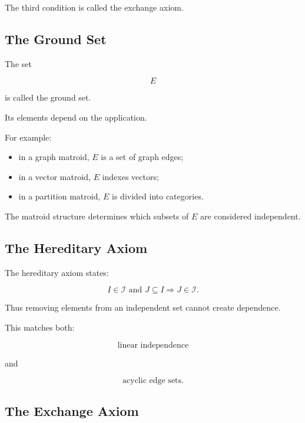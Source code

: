 The third condition is called the exchange axiom.

\subsection{The Ground Set}
\label{subsec:matroid-ground-set}

The set

\[
E
\]

is called the ground set.

Its elements depend on the application.

For example:

\begin{itemize}
    \item in a graph matroid, \(E\) is a set of graph edges;
    \item in a vector matroid, \(E\) indexes vectors;
    \item in a partition matroid, \(E\) is divided into categories.
\end{itemize}

The matroid structure determines which subsets of \(E\) are considered
independent.

\subsection{The Hereditary Axiom}
\label{subsec:matroid-hereditary}

The hereditary axiom states:

\[
\boxed{
I\in\mathcal{I}
\text{ and }
J\subseteq I
\Longrightarrow
J\in\mathcal{I}.
}
\]

Thus removing elements from an independent set cannot create
dependence.

This matches both:

\[
\text{linear independence}
\]

and

\[
\text{acyclic edge sets}.
\]

\subsection{The Exchange Axiom}
\label{subsec:matroid-exchange}

